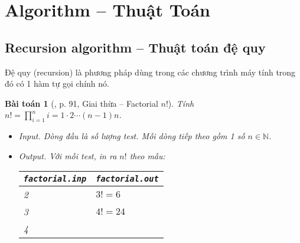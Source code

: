 \documentclass{article}
\newtheorem{baitoan}{Bài toán}
\begin{document}

\section{Algorithm -- Thuật Toán}

\subsection{Recursion algorithm -- Thuật toán đệ quy}
Đệ quy (recursion) là phương pháp dùng trong các chương trình máy tính trong đó có 1 hàm tự gọi chính nó.

\begin{baitoan}[\cite{VietSTEM2021}, p. 91, Giai thừa -- Factorial $n!$]
	Tính $n! = \prod_{i=1}^n i = 1\cdot2\cdots(n - 1)n$.
	\begin{itemize}
		\item {\sf Input.} Dòng đầu là số lượng test. Mỗi dòng tiếp theo gồm 1 số $n\in\mathbb{N}$.
		\item {\sf Output.} Với mỗi test, in ra $n!$ theo mẫu:
		\begin{table}[H]
			\centering
			\begin{tabular}{|l|l|}
				\hline
				\texttt{factorial.inp} & \texttt{factorial.out} \\
				\hline
				2 & $3! = 6$ \\
				3 & $4! = 24$ \\
				4 &  \\
				\hline
			\end{tabular}
		\end{table}
	\end{itemize}
\end{baitoan}
\end{document}
